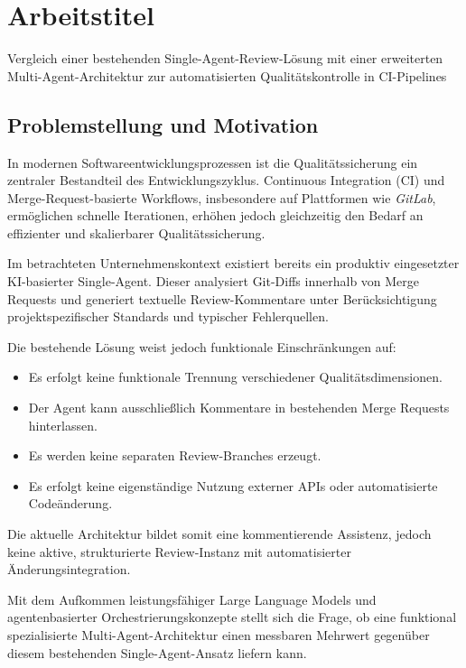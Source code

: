 \section{Arbeitstitel}\label{sec:introduction}

Vergleich einer bestehenden Single-Agent-Review-Lösung mit einer erweiterten Multi-Agent-Architektur zur automatisierten Qualitätskontrolle in CI-Pipelines



\subsection{Problemstellung und Motivation}

In modernen Softwareentwicklungsprozessen ist die Qualitätssicherung ein zentraler Bestandteil des Entwicklungszyklus. Continuous Integration (CI) und Merge-Request-basierte Workflows, insbesondere auf Plattformen wie \textit{GitLab}, ermöglichen schnelle Iterationen, erhöhen jedoch gleichzeitig den Bedarf an effizienter und skalierbarer Qualitätssicherung.

Im betrachteten Unternehmenskontext existiert bereits ein produktiv eingesetzter KI-basierter Single-Agent. Dieser analysiert Git-Diffs innerhalb von Merge Requests und generiert textuelle Review-Kommentare unter Berücksichtigung projektspezifischer Standards und typischer Fehlerquellen. 

Die bestehende Lösung weist jedoch funktionale Einschränkungen auf:

\begin{itemize}
	\item Es erfolgt keine funktionale Trennung verschiedener Qualitätsdimensionen.
	\item Der Agent kann ausschließlich Kommentare in bestehenden Merge Requests hinterlassen.
	\item Es werden keine separaten Review-Branches erzeugt.
	\item Es erfolgt keine eigenständige Nutzung externer APIs oder automatisierte Codeänderung.
\end{itemize}

Die aktuelle Architektur bildet somit eine kommentierende Assistenz, jedoch keine aktive, strukturierte Review-Instanz mit automatisierter Änderungsintegration.

Mit dem Aufkommen leistungsfähiger Large Language Models und agentenbasierter Orchestrierungskonzepte stellt sich die Frage, ob eine funktional spezialisierte Multi-Agent-Architektur einen messbaren Mehrwert gegenüber diesem bestehenden Single-Agent-Ansatz liefern kann.


